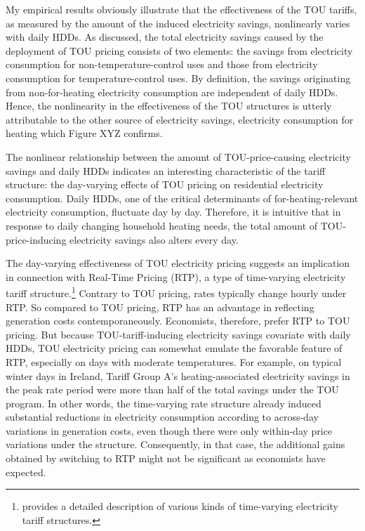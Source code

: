 My empirical results obviously illustrate that the effectiveness of the TOU tariffs, as measured by the amount of the induced electricity savings, nonlinearly varies with daily HDDs. As discussed, the total electricity savings caused by the deployment of TOU pricing consists of two elements: the savings from electricity consumption for non-temperature-control uses and those from electricity consumption for temperature-control uses. By definition, the savings originating from non-for-heating electricity consumption are independent of daily HDDs. Hence, the nonlinearity in the effectiveness of the TOU structures is utterly attributable to the other source of electricity savings, electricity consumption for heating which Figure XYZ confirms. 

The nonlinear relationship between the amount of TOU-price-causing electricity savings and daily HDDs indicates an interesting characteristic of the tariff structure: the day-varying effects of TOU pricing on residential electricity consumption. Daily HDDs, one of the critical determinants of for-heating-relevant electricity consumption, fluctuate day by day. Therefore, it is intuitive that in response to daily changing household heating needs, the total amount of TOU-price-inducing electricity savings also alters every day. 

The day-varying effectiveness of TOU electricity pricing suggests an implication in connection with Real-Time Pricing (RTP), a type of time-varying electricity tariff structure.\footnote{\cite{Household-Responses-to-Time-Varying-Electricity-Prices_Harding-and-Sexton_2017} provides a detailed description of various kinds of time-varying electricity tariff structures.} Contrary to TOU pricing, rates typically change hourly under RTP. So compared to TOU pricing, RTP has an advantage in reflecting generation costs contemporaneously. Economists, therefore, prefer RTP to TOU pricing. But because TOU-tariff-inducing electricity savings covariate with daily HDDs, TOU electricity pricing can somewhat emulate the favorable feature of RTP, especially on days with moderate temperatures. For example, on typical winter days in Ireland, Tariff Group A's heating-associated electricity savings in the peak rate period were more than half of the total savings under the TOU program. In other words, the time-varying rate structure already induced substantial reductions in electricity consumption according to across-day variations in generation costs, even though there were only within-day price variations under the structure. Consequently, in that case, the additional gains obtained by switching to RTP might not be significant as economists have expected. 

